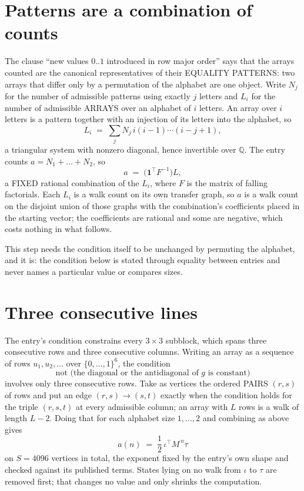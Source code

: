 \documentclass[11pt,a4paper]{article}
\theoremstyle{plain}
\theoremstyle{definition}
\begin{document}
\section{Patterns are a combination of counts}

The clause ``new values $0..1$ introduced in row major order'' says that the arrays
counted are the canonical representatives of their EQUALITY PATTERNS: two arrays that differ
only by a permutation of the alphabet are one object. Write $N_j$ for the number of admissible
patterns using exactly $j$ letters and $L_i$ for the number of admissible ARRAYS over an
alphabet of $i$ letters. An array over $i$ letters is a pattern together with an injection of
its letters into the alphabet, so
\[
L_i\;=\;\sum_{j}N_j\,i(i-1)\cdots(i-j+1),
\]
a triangular system with nonzero diagonal, hence invertible over $\mathbb{Q}$. The entry
counts $a=N_1+\dots+N_{2}$, so
\[
a\;=\;\bigl(\mathbf{1}^{\!\top}F^{-1}\bigr)L ,
\]
a FIXED rational combination of the $L_i$, where $F$ is the matrix of falling factorials.
Each $L_i$ is a walk count on its own transfer graph, so $a$ is a walk count on the disjoint
union of those graphs with the combination's coefficients placed in the starting vector; the
coefficients are rational and some are negative, which costs nothing in what follows.

This step needs the condition itself to be unchanged by permuting the alphabet, and it is:
the condition below is stated through equality between entries and never names a particular
value or compares sizes.

\section{Three consecutive lines}

The entry's condition constrains every $3\times3$ subblock, which spans three consecutive
rows and three consecutive columns. Writing an array as a sequence of rows
$u_1,u_2,\dots$ over $\{0,\dots,1\}^{6}$, the condition
\[
\text{not }\bigl(\text{the diagonal or the antidiagonal of }g\text{ is constant}\bigr)
\]
involves only three consecutive rows. Take as vertices the ordered PAIRS $(r,s)$ of
rows and put an edge $(r,s)\to(s,t)$ exactly when the condition holds for the triple
$(r,s,t)$ at every admissible column; an array with $L$ rows is a walk of length $L-2$.
Doing that for each alphabet size $1,\dots,2$ and combining as above gives
\[
a(n)\;=\;\frac{1}{2}\,\iota^{\!\top}M^{\,n}\tau
\]
on $S=4096$ vertices in total, the exponent fixed by the entry's own shape and checked against
its published terms. States lying on no walk from $\iota$ to $\tau$ are removed first; that
changes no value and only shrinks the computation.
\end{document}
